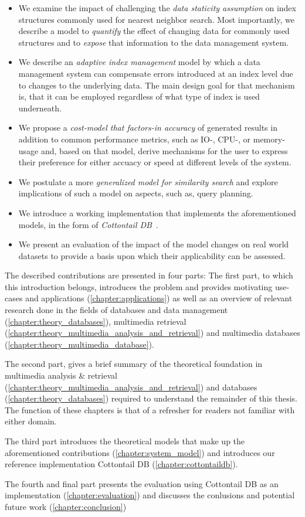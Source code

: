 \begin{itemize}
    \item We examine the impact of challenging the \emph{data staticity assumption} on index structures commonly used for nearest neighbor search. Most importantly, we describe a model to \emph{quantify} the effect of changing data for commonly used structures and to \emph{expose} that information to the data management system.
    \item We describe an \emph{adaptive index management} model by which a data management system can compensate errors introduced at an index level due to changes to the underlying data. The main design goal for that mechanism is, that it can be employed regardless of what type of index is used underneath.
    \item We propose a \emph{cost-model that factors-in accuracy} of generated results in addition to common performance metrics, such as IO-, CPU-, or memory-usage and, based on that model, derive mechanisms for the user to express their preference for either accuacy or speed at different levels of the system.
    \item We postulate a more \emph{generalized model for similarity search} and explore implications of such a model on aspects, such as, query planning.
    \item We introduce a working implementation that implements the aforementioned models, in the form of \emph{Cottontail DB}~\cite{Gasser:2020Cottontail}.
    \item We present an evaluation of the impact of the model changes on real world datasets to provide a basis upon which their applicability can be assessed.
\end{itemize}

The described contributions are presented in four parts: The first part, to which this introduction belongs, introduces the problem and provides motivating use-cases and applications (\cref{chapter:applications}) as well as an overview of relevant research done in the fields of databases and  data management (\cref{chapter:theory_databases}), multimedia retrieval (\cref{chapter:theory_multimedia_analysis_and_retrieval}) and multimedia databases (\cref{chapter:theory_multimedia_database}).

The second part, gives a brief summary of the theoretical foundation in multimedia analysis \& retrieval (\cref{chapter:theory_multimedia_analysis_and_retrieval}) and databases (\cref{chapter:theory_databases}) required to understand the remainder of this thesis. The function of these chapters is that of a refresher for readers not familiar with either domain.

The third part introduces the theoretical models that make up the aforementioned contributions (\cref{chapter:system_model}) and introduces our reference implementation Cottontail DB (\cref{chapter:cottontaildb}).

The fourth and final part presents the evaluation using Cottontail DB as an implementation (\cref{chapter:evaluation}) and discusses the conlusions and potential future work (\cref{chapter:conclusion})